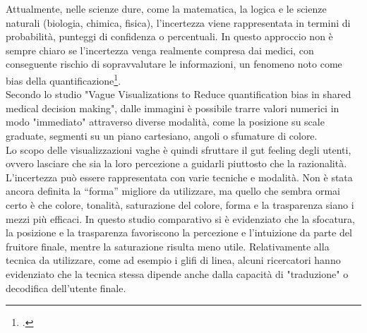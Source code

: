 Attualmente, nelle scienze dure, come la matematica, la logica e le scienze naturali (biologia, chimica, fisica), l'incertezza viene rappresentata in termini di probabilità, punteggi di confidenza o percentuali. In questo approccio non è sempre chiaro se l'incertezza venga realmente compresa dai medici, con conseguente rischio di sopravvalutare le informazioni, un fenomeno noto come bias della quantificazione\footcite{womak:vague-visualizations-quantification-bias}.\\
Secondo lo studio "Vague Visualizations to Reduce quantification bias in shared medical decision making", dalle immagini è possibile trarre valori numerici in modo "immediato" attraverso diverse modalità, come la posizione su scale graduate, segmenti su un piano cartesiano, angoli o sfumature di colore.\\
Lo scopo delle visualizzazioni vaghe è quindi sfruttare il gut feeling degli utenti, ovvero lasciare che sia la loro percezione a guidarli piuttosto che la razionalità.\\

L'incertezza può essere rappresentata con varie tecniche e modalità. Non è stata ancora definita la “forma” migliore da utilizzare, ma quello che sembra ormai certo è che colore, tonalità, saturazione del colore, forma e la trasparenza siano i mezzi più efficaci. In questo studio comparativo si è evidenziato che la sfocatura, la posizione e la trasparenza favoriscono la percezione e l'intuizione da parte del fruitore finale, mentre la saturazione risulta meno utile. Relativamente alla tecnica da utilizzare, come ad esempio i glifi di linea, alcuni ricercatori hanno evidenziato che la tecnica stessa dipende anche dalla capacità di "traduzione" o decodifica dell'utente finale.\\

